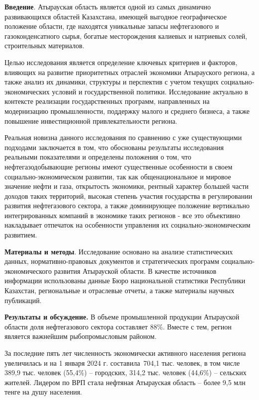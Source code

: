 \begin{multicols}{2}
{\bfseries Введение}. Атырауская область является одной из самых динамично
развивающихся областей Казахстана, имеющей выгодное географическое
положение области, где находятся уникальные запасы нефтегазового и
газоконденсатного сырья, богатые месторождения калиевых и натриевых
солей, строительных материалов.

Целью исследования является определение ключевых критериев и факторов,
влияющих на развитие приоритетных отраслей экономики Атырауского
региона, а также анализ их динамики, структуры и перспектив с учетом
текущих социально-экономических условий и государственной политики.
Исследование актуально в контексте реализации государственных программ,
направленных на модернизацию промышленности, поддержку малого и среднего
бизнеса, а также повышение инвестиционной привлекательности региона.

Реальная новизна данного исследования по сравнению с уже существующими
подходами заключается в том, что обоснованы результаты исследования
реальными показателями и определены положения о том, что
нефтегазодобывающие регионы имеют существенные особенности в своем
социально-экономическом развитии, так как общенациональное и мировое
значение нефти и газа, открытость экономики, рентный характер большей
части доходов таких территорий, высокая степень участия государства в
регулировании развития нефтегазового сектора, а также доминирующее
положение вертикально интегрированных компаний в экономике таких
регионов - все это объективно накладывает отпечаток на особенности
управления их социально-экономическим развитием.

{\bfseries Материалы и методы}. Исследование основано на анализе
статистических данных, нормативно-правовых документов и стратегических
программ социально-экономического развития Атырауской области. В
качестве источников информации использованы данные Бюро национальной
статистики Республики Казахстан, региональные и отраслевые отчеты, а
также материалы научных публикаций.

{\bfseries Результаты и обсуждение.} В объеме промышленной продукции
Атырауской области доля нефтегазового сектора составляет 88\%. Вместе с
тем, регион является важнейшим рыбопромысловым районом.

За последние пять лет чис­ленность экономически активного населения
региона увеличилась и на 1 января 2024 г. составила~704,1 тыс. человек,
в том числе 389,9 тыс. человек (55,4\%) -- городских, 314,2 тыс. человек
(44,6\%) -- сельских жителей. Лидером по ВРП стала нефтяная Атырауская
область -- более 9,5 млн тенге на душу населения.


\end{multicols}

